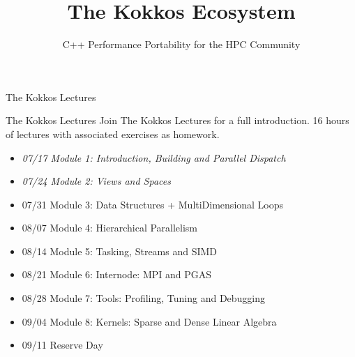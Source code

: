 
\usepackage{tikz}
\def\sandid{SAND2020-7755 PE}

\title{The Kokkos Ecosystem}

\author{C++ Performance Portability for the HPC Community}




\shorttrue
\mediumfalse
\fullfalse




% 

\begin{frame}
	\titlepage
\end{frame}



\begin{frame}{The Kokkos Lectures}
        
	\begin{block}{The Kokkos Lectures}
		Join The Kokkos Lectures for a full introduction. 16 hours of lectures with associated exercises as homework.
	\end{block}

\begin{itemize}
	\item \textit{07/17 Module 1: Introduction, Building and Parallel Dispatch}
	\item \textit{07/24 Module 2: Views and Spaces}
	\item 07/31 Module 3: Data Structures + MultiDimensional Loops
	\item 08/07 Module 4: Hierarchical Parallelism
	\item 08/14 Module 5: Tasking, Streams and SIMD
	\item 08/21 Module 6: Internode: MPI and PGAS
	\item 08/28 Module 7: Tools: Profiling, Tuning and Debugging
	\item 09/04 Module 8: Kernels: Sparse and Dense Linear Algebra
        \item 09/11 Reserve Day
\end{itemize}
\end{frame}

